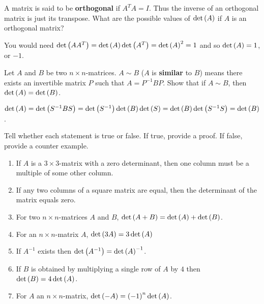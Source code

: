 \begin{enumialphparenastyle}
\begin{ex} \label{exer-orthogonal}A matrix is said to be \textbf{orthogonal}  if 
$A^{T}A=I$. Thus the inverse of an orthogonal matrix is just its transpose.
What are the possible values of $\det \left(A\right) $ if $A$ is an
orthogonal matrix? 
\begin{sol}
You would need $\det \left(AA^{T}\right) =\det
\left(A\right) \det \left(A^{T}\right) =\det \left(A\right) ^{2}=1$ and
so $\det \left(A\right) =1$, or $-1$.
\end{sol}
\end{ex}

\begin{ex} Let $A$ and $B$ be two $n\times n$-matrices. $A\sim B$
($A$ is \textbf{similar} to $B$) means there exists an invertible matrix $P$
such that $A=P^{-1}BP$. Show that if $A\sim B$, then 
$\det \left(A\right) =\det \left(B\right)$. 
\begin{sol}
$\det \left(A\right) =\det
\left(S^{-1}BS\right) =\det \left(S^{-1}\right) \det \left(B\right) \det
\left(S\right) =\det \left(B\right) \det \left(S^{-1}S\right) =\det
\left(B\right)$.
\end{sol}
\end{ex}

\begin{ex} Tell whether each statement is true or false. If true, provide a proof. If false, provide a counter example. 
\begin{enumerate}
\item If $A$ is a $3\times 3$-matrix with a zero determinant, then one
column must be a multiple of some other column.

\item If any two columns of a square matrix are equal, then the determinant
of the matrix equals zero.

\item For two $n\times n$-matrices $A$ and $B$, $\det \left(A+B\right)
=\det \left(A\right) +\det \left(B\right)$.

\item For an $n\times n$-matrix $A$, $\det \left(3A\right) =3\det \left(
A\right) $

\item If $A^{-1}$ exists then $\det \left(A^{-1}\right) =\det \left(
A\right) ^{-1}$.

\item If $B$ is obtained by multiplying a single row of $A$ by $4$ then $%
\det \tup{B} =4\det \tup{A}$.

\item For $A$ an $n\times n$-matrix, $\det \left(-A\right) =\left(
-1\right) ^{n}\det \left(A\right)$.


\end{enumerate}
\end{ex}
\end{enumialphparenastyle}
